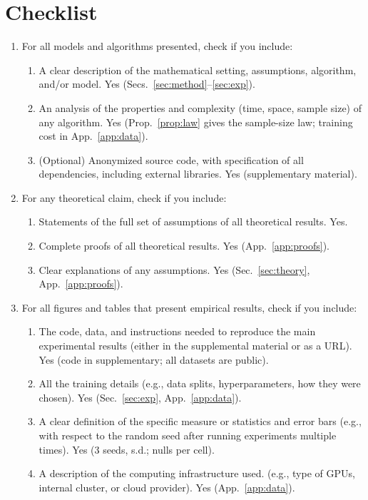 \documentclass[twoside]{article}
\begin{document}
\section*{Checklist}
\begin{enumerate}
\item For all models and algorithms presented, check if you include:
\begin{enumerate}
\item A clear description of the mathematical setting, assumptions, algorithm, and/or model. Yes (Secs.~\ref{sec:method}--\ref{sec:exp}).
\item An analysis of the properties and complexity (time, space, sample size) of any algorithm. Yes (Prop.~\ref{prop:law} gives the sample-size law; training cost in App.~\ref{app:data}).
\item (Optional) Anonymized source code, with specification of all dependencies, including external libraries. Yes (supplementary material).
\end{enumerate}
\item For any theoretical claim, check if you include:
\begin{enumerate}
\item Statements of the full set of assumptions of all theoretical results. Yes.
\item Complete proofs of all theoretical results. Yes (App.~\ref{app:proofs}).
\item Clear explanations of any assumptions. Yes (Sec.~\ref{sec:theory}, App.~\ref{app:proofs}).
\end{enumerate}
\item For all figures and tables that present empirical results, check if you include:
\begin{enumerate}
\item The code, data, and instructions needed to reproduce the main experimental results (either in the supplemental material or as a URL). Yes (code in supplementary; all datasets are public).
\item All the training details (e.g., data splits, hyperparameters, how they were chosen). Yes (Sec.~\ref{sec:exp}, App.~\ref{app:data}).
\item A clear definition of the specific measure or statistics and error bars (e.g., with respect to the random seed after running experiments multiple times). Yes (3 seeds, s.d.; nulls per cell).
\item A description of the computing infrastructure used. (e.g., type of GPUs, internal cluster, or cloud provider). Yes (App.~\ref{app:data}).

\end{enumerate}
\end{enumerate}
\end{document}
